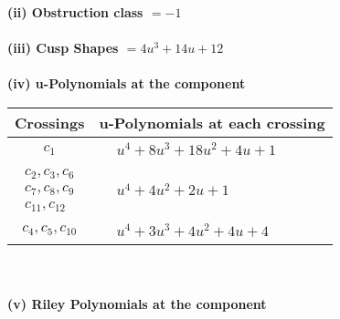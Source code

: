 \documentclass[1p]{elsarticle_modified}
\theoremstyle{definition}
\begin{document}
\flushleft \textbf{(ii) Obstruction class $= -1$}\\~\\
\flushleft \textbf{(iii) Cusp Shapes $= 4 u^3+14 u+12$}\\~\\
\newpage\renewcommand{\arraystretch}{1}
\flushleft \textbf{(iv) u-Polynomials at the component}\newline \\
\begin{tabular}{m{50pt}|m{274pt}}
Crossings & \hspace{64pt}u-Polynomials at each crossing \\
\hline $$\begin{aligned}c_{1}\end{aligned}$$&$\begin{aligned}
&u^4+8 u^3+18 u^2+4 u+1
\end{aligned}$\\
\hline $$\begin{aligned}c_{2},c_{3},c_{6}\\c_{7},c_{8},c_{9}\\c_{11},c_{12}\end{aligned}$$&$\begin{aligned}
&u^4+4 u^2+2 u+1
\end{aligned}$\\
\hline $$\begin{aligned}c_{4},c_{5},c_{10}\end{aligned}$$&$\begin{aligned}
&u^4+3 u^3+4 u^2+4 u+4
\end{aligned}$\\
\hline
\end{tabular}\\~\\
\newpage\renewcommand{\arraystretch}{1}
\flushleft \textbf{(v) Riley Polynomials at the component}\newline \\
\end{document}
